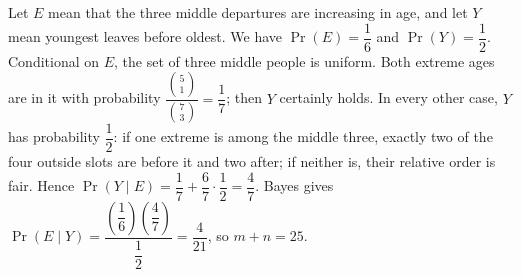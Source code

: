Let $E$ mean that the three middle departures are increasing in age, and let $Y$ mean youngest leaves before oldest. We have $\Pr(E)=\dfrac{1}{6}$ and $\Pr(Y)=\dfrac{1}{2}$. Conditional on $E$, the set of three middle people is uniform. Both extreme ages are in it with probability $\dfrac{\binom51}{\binom73}=\dfrac{1}{7}$; then $Y$ certainly holds. In every other case, $Y$ has probability $\dfrac{1}{2}$: if one extreme is among the middle three, exactly two of the four outside slots are before it and two after; if neither is, their relative order is fair. Hence $\Pr(Y\mid E)=\dfrac{1}{7}+\dfrac{6}{7}\cdot\dfrac{1}{2}=\dfrac{4}{7}$. Bayes gives $\Pr(E\mid Y)=\dfrac{(\dfrac{1}{6})(\dfrac{4}{7})}{\dfrac{1}{2}}=\dfrac{4}{21}$, so $m+n=\boxed{25}$.
